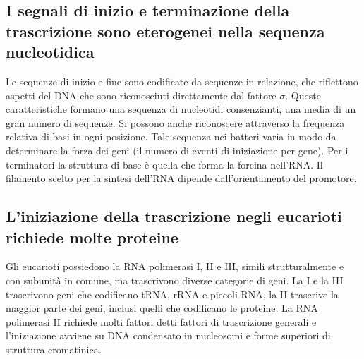 \subsection{I segnali di inizio e terminazione della trascrizione sono eterogenei nella sequenza nucleotidica}
Le sequenze di inizio e fine sono codificate da sequenze in relazione, che riflettono aspetti del DNA che sono riconosciuti direttamente dal fattore $\sigma$. Queste caratteristiche 
formano una sequenza di nucleotidi consenzianti, una media di un gran numero di sequenze. Si possono anche riconoscere attraverso la frequenza relativa di basi in ogni posizione. Tale
sequenza nei batteri varia in modo da determinare la forza dei geni (il numero di eventi di iniziazione per gene). Per i terminatori la struttura di base \`e quella che forma la 
forcina nell'RNA. Il filamento scelto per la sintesi dell'RNA dipende dall'orientamento del promotore. 
\subsection{L'iniziazione della trascrizione negli eucarioti richiede molte proteine}
Gli eucarioti possiedono la RNA polimerasi I, II e III, simili strutturalmente e con subunit\`a in comune, ma trascrivono diverse categorie di geni. La I e la III trascrivono geni che 
codificano tRNA, rRNA e piccoli RNA, la II trascrive la maggior parte dei geni, inclusi quelli che codificano le proteine. La RNA polimerasi II  richiede molti fattori detti fattori di 
trascrizione generali e l'iniziazione avviene su DNA condensato in nucleosomi e forme superiori di struttura cromatinica. 
